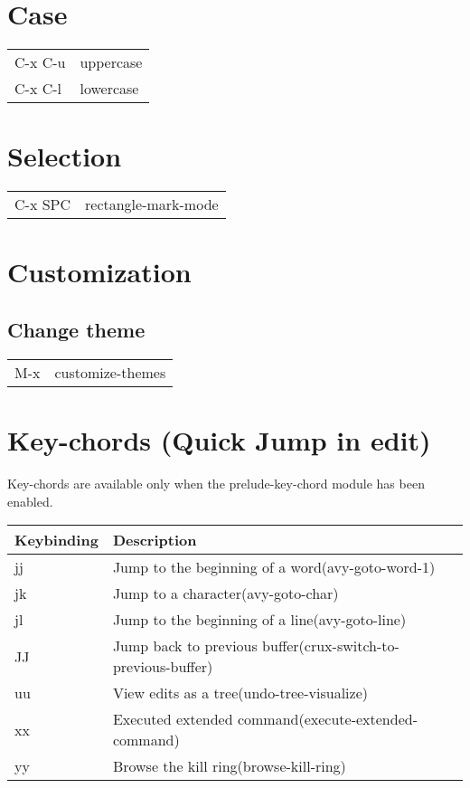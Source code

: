\documentclass[11pt]{article}
\begin{document}
\section{Case}
\label{sec:org8417a26}
\begin{center}
\begin{tabular}{ll}
\hline
C-x C-u & uppercase\\
C-x C-l & lowercase\\
\end{tabular}
\end{center}

\section{Selection}
\label{sec:orga248c37}
\begin{center}
\begin{tabular}{ll}
\hline
C-x SPC & rectangle-mark-mode\\
\end{tabular}
\end{center}

\section{Customization}
\label{sec:orgd4e4a42}
\subsection{Change theme}
\label{sec:orgb3b12c4}
\begin{center}
\begin{tabular}{ll}
\hline
M-x & customize-themes\\
\end{tabular}
\end{center}

\section{Key-chords (Quick Jump in edit)}
\label{sec:org66937fc}
Key-chords are available only when the prelude-key-chord module has been enabled.\\

\begin{center}
\begin{tabular}{ll}
Keybinding & Description\\
\hline
jj & Jump to the beginning of a word(avy-goto-word-1)\\
jk & Jump to a character(avy-goto-char)\\
jl & Jump to the beginning of a line(avy-goto-line)\\
JJ & Jump back to previous buffer(crux-switch-to-previous-buffer)\\
uu & View edits as a tree(undo-tree-visualize)\\
xx & Executed extended command(execute-extended-command)\\
yy & Browse the kill ring(browse-kill-ring)\\
\end{tabular}
\end{center}
\end{document}
